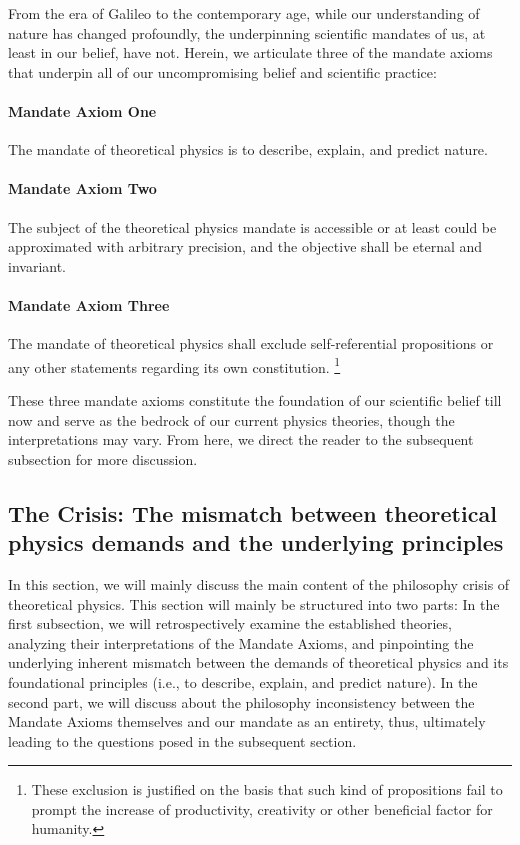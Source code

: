 \documentclass{article}
\begin{document}
From the era of Galileo to the contemporary age, while our understanding of nature has changed profoundly, the underpinning scientific mandates of us, at least in our belief, have not. Herein, we articulate three of the mandate axioms that underpin all of our uncompromising belief and scientific practice:

\paragraph{Mandate Axiom One} The mandate of theoretical physics is to describe, explain, and predict nature.

\paragraph{Mandate Axiom Two} The subject of the theoretical physics mandate is accessible or at least could be approximated with arbitrary precision, and the objective shall be eternal and invariant.

\paragraph{Mandate Axiom Three} The mandate of theoretical physics shall exclude self-referential propositions or any other statements regarding its own constitution. \footnote{These exclusion is justified on the basis that such kind of propositions fail to prompt the increase of productivity, creativity or other beneficial factor for humanity.}

These three mandate axioms constitute the foundation of our scientific belief till now and serve as the bedrock of our current physics theories, though the interpretations may vary. From here, we direct the reader to the subsequent subsection for more discussion.

\subsection{The Crisis: The mismatch between theoretical physics demands and the underlying principles}

In this section, we will mainly discuss the main content of the philosophy crisis of theoretical physics. This section will mainly be structured into two parts: In the first subsection, we will retrospectively examine the established theories, analyzing their interpretations of the Mandate Axioms, and pinpointing the underlying inherent mismatch between the demands of theoretical physics and its foundational principles (i.e., to describe, explain, and predict nature). \cite{barandes2026} In the second part, we will discuss about the philosophy inconsistency between the Mandate Axioms themselves and our mandate as an entirety, thus, ultimately leading to the questions posed in the subsequent section.
\end{document}
